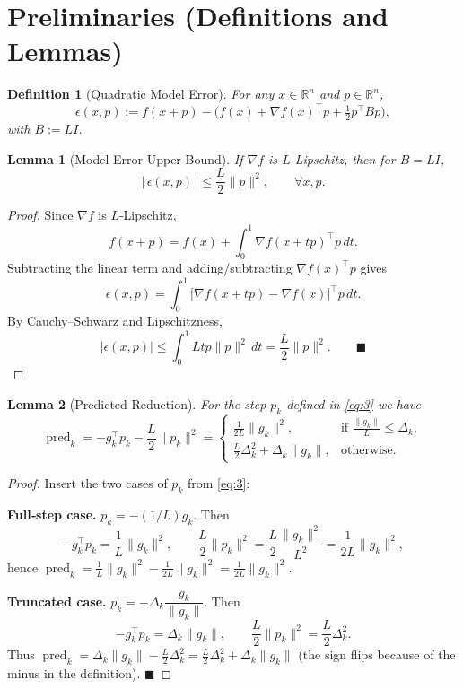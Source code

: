 \documentclass[11pt]{article}
\newtheorem{lemma}{Lemma}[section]
\newtheorem{definition}{Definition}[section]
\begin{document}
\section*{Preliminaries (Definitions and Lemmas)}
\begin{definition}[Quadratic Model Error]\label{def:modelerror}
For any $x\in\mathbb{R}^{n}$ and $p\in\mathbb{R}^{n}$,
\[
\epsilon(x,p):=f(x+p)-\bigl(f(x)+\nabla f(x)^{\!\top}p+\tfrac12 p^{\!\top}B p\bigr),
\]
with $B:=L I$.
\end{definition}
\begin{lemma}[Model Error Upper Bound]\label{lem:errorbound}
If $\nabla f$ is $L$‑Lipschitz, then for $B=LI$,
\[
\bigl|\,\epsilon(x,p)\,\bigr|\le \frac{L}{2}\|p\|^{2},\qquad\forall x,p.
\tag{9}
\]
\end{lemma}
\begin{proof}
Since $\nabla f$ is $L$‑Lipschitz,
\[
f(x+p)=f(x)+\int_{0}^{1}\nabla f(x+tp)^{\!\top}p\,dt.
\]
Subtracting the linear term and adding/subtracting $\nabla f(x)^{\!\top}p$ gives
\[
\epsilon(x,p)=\int_{0}^{1}\bigl[\nabla f(x+tp)-\nabla f(x)\bigr]^{\!\top}p\,dt.
\]
By Cauchy–Schwarz and Lipschitzness,
\[
|\epsilon(x,p)|
\le\int_{0}^{1}Ltp\|p\|^{2}\,dt
= \frac{L}{2}\|p\|^{2}.
\qquad\blacksquare
\]
\end{proof}

\begin{lemma}[Predicted Reduction]\label{lem:pred}
For the step $p_{k}$ defined in \eqref{eq:3} we have
\[
\operatorname{pred}_{k}= -g_{k}^{\!\top}p_{k}-\frac{L}{2}\|p_{k}\|^{2}
=
\begin{cases}
\displaystyle\frac{1}{2L}\|g_{k}\|^{2}, & \text{if }\frac{\|g_{k}\|}{L}\le\Delta_{k},\\[2ex]
\displaystyle\frac{L}{2}\Delta_{k}^{2}
+\Delta_{k}\|g_{k}\|, & \text{otherwise}.
\end{cases}
\tag{10}
\]
\end{lemma}
\begin{proof}
Insert the two cases of $p_{k}$ from \eqref{eq:3}:

\noindent\textbf{Full‑step case.} $p_{k}=-(1/L)g_{k}$. Then
\[
-g_{k}^{\!\top}p_{k}=\frac{1}{L}\|g_{k}\|^{2},
\qquad
\frac{L}{2}\|p_{k}\|^{2}
=\frac{L}{2}\frac{\|g_{k}\|^{2}}{L^{2}}
=\frac{1}{2L}\|g_{k}\|^{2},
\]
hence $\operatorname{pred}_{k}= \frac{1}{L}\|g_{k}\|^{2}-\frac{1}{2L}\|g_{k}\|^{2}
=\frac{1}{2L}\|g_{k}\|^{2}$.

\noindent\textbf{Truncated case.} $p_{k}= -\Delta_{k}\dfrac{g_{k}}{\|g_{k}\|}$. Then
\[
-g_{k}^{\!\top}p_{k}= \Delta_{k}\|g_{k}\|,
\qquad
\frac{L}{2}\|p_{k}\|^{2}= \frac{L}{2}\Delta_{k}^{2}.
\]
Thus $\operatorname{pred}_{k}= \Delta_{k}\|g_{k}\|-\frac{L}{2}\Delta_{k}^{2}
= \frac{L}{2}\Delta_{k}^{2}+\Delta_{k}\|g_{k}\|$ (the sign flips because of the minus
in the definition).  $\blacksquare$
\end{proof}
\end{document}
